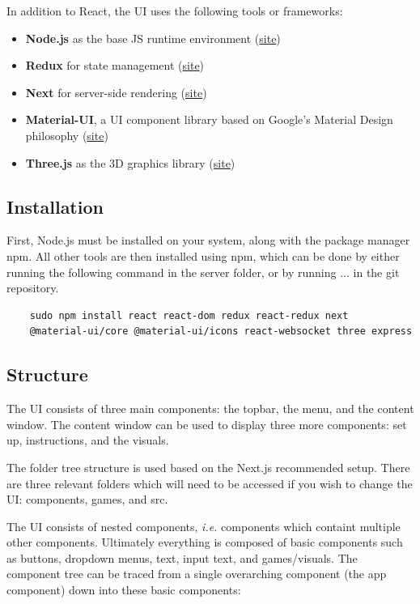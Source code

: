 \documentclass{article}
\begin{document}
	In addition to React, the UI uses the following tools or frameworks: 
	
	\begin{itemize}
		\item \textbf{Node.js} as the base JS runtime environment (\href{https://nodejs.org/en/}{site})
		\item \textbf{Redux} for state management (\href{https://redux.js.org/}{site})
		\item \textbf{Next} for server-side rendering (\href{https://nextjs.org/}{site})
		\item \textbf{Material-UI}, a UI component library based on Google's Material Design philosophy (\href{https://material-ui.com/}{site})
		\item \textbf{Three.js} as the 3D graphics library (\href{https://threejs.org/}{site})
	\end{itemize}
	
	\subsection{Installation}
	
	First, Node.js must be installed on your system, along with the package manager npm. All other tools are then installed using npm, which can be done by either running the following command in the server folder, or by running ... in the git repository.
	
	\begin{verbatim}
	sudo npm install react react-dom redux react-redux next 
	@material-ui/core @material-ui/icons react-websocket three express
	\end{verbatim}
	
	\subsection{Structure}
	
	The UI consists of three main components: the topbar, the menu, and the content window. The content window can be used to display three more components: set up, instructions, and the visuals. 
	
	The folder tree structure is used based on the Next.js recommended setup. There are three relevant folders which will need to be accessed if you wish to change the UI: components, games, and src. 
	
	The UI consists of nested components, \textit{i.e.} components which containt multiple other components. Ultimately everything is composed of basic components such as buttons, dropdown menus, text, input text, and games/visuals. The component tree can be traced from a single overarching component (the app component) down into these basic components:
	
\end{document}
